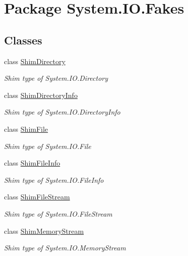 \hypertarget{namespace_system_1_1_i_o_1_1_fakes}{\section{Package System.\-I\-O.\-Fakes}
\label{namespace_system_1_1_i_o_1_1_fakes}
}
\subsection*{Classes}
\begin{DoxyCompactItemize}
\item 
class \hyperlink{class_system_1_1_i_o_1_1_fakes_1_1_shim_directory}{Shim\-Directory}
\begin{DoxyCompactList}\small\item\em Shim type of System.\-I\-O.\-Directory\end{DoxyCompactList}\item 
class \hyperlink{class_system_1_1_i_o_1_1_fakes_1_1_shim_directory_info}{Shim\-Directory\-Info}
\begin{DoxyCompactList}\small\item\em Shim type of System.\-I\-O.\-Directory\-Info\end{DoxyCompactList}\item 
class \hyperlink{class_system_1_1_i_o_1_1_fakes_1_1_shim_file}{Shim\-File}
\begin{DoxyCompactList}\small\item\em Shim type of System.\-I\-O.\-File\end{DoxyCompactList}\item 
class \hyperlink{class_system_1_1_i_o_1_1_fakes_1_1_shim_file_info}{Shim\-File\-Info}
\begin{DoxyCompactList}\small\item\em Shim type of System.\-I\-O.\-File\-Info\end{DoxyCompactList}\item 
class \hyperlink{class_system_1_1_i_o_1_1_fakes_1_1_shim_file_stream}{Shim\-File\-Stream}
\begin{DoxyCompactList}\small\item\em Shim type of System.\-I\-O.\-File\-Stream\end{DoxyCompactList}\item 
class \hyperlink{class_system_1_1_i_o_1_1_fakes_1_1_shim_memory_stream}{Shim\-Memory\-Stream}
\begin{DoxyCompactList}\small\item\em Shim type of System.\-I\-O.\-Memory\-Stream\end{DoxyCompactList}\item 

\end{DoxyCompactItemize}
